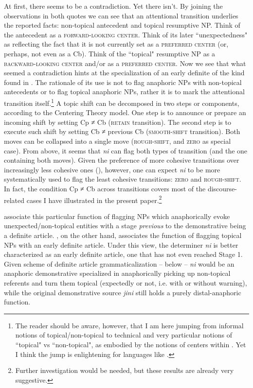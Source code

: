 \documentclass[output=paper
,modfonts
,nonflat]{langsci/langscibook}
\begin{document}
At first, there seems to be a contradiction. Yet there isn't. By joining the observations in both quotes we can see that an attentional transition underlies the reported facts: non-topical antecedent and topical resumptive NP. Think of the antecedent as a \textsc{forward-looking center}. Think of its later ``unexpectedness" as reflecting the fact that it is not currently set as a \textsc{preferred center} (or, perhaps, not even as a Cb). Think of the ``topical" resumptive NP as a \textsc{backward-looking center} and/or as a \textsc{preferred center}. Now we see that what seemed a contradiction hints at the specialization of an early definite of the kind found in . The rationale of its use is not to flag anaphoric NPs with non-topical antecedents or to flag topical anaphoric NPs, rather it is to mark the attentional transition itself.\footnote{The reader should be aware, however, that I am here jumping from informal notions of topical/non-topical to technical and very particular notions of ``topical" vs ``non-topical", as embodied by the notions of centers within . Yet I think the jump is enlightening for languages like .} 
A topic shift can be decomposed in two steps or components, according to the Centering Theory model. One step is to announce or prepare an incoming shift by setting Cp ≠ Cb (\textsc{retain} transition). The second step is to execute such shift by setting Cb ≠ previous Cb (\textsc{smooth-shift} transition). 
Both moves can be collapsed into a single move (\textsc{rough-shift}, and \textsc{zero} as special case). From  above, it seems that \textit{ni} can flag both types of transition (and the one containing both moves). 
Given the preference of more cohesive transitions over increasingly less cohesive ones (), however, one can expect \textit{ni} to be more systematically used to flag the least cohesive transitions: \textsc{zero} and \textsc{rough-shift}. In fact, the condition Cp ≠ Cb across transitions covers most of the discourse-related cases I have illustrated in the present paper.\footnote{Further investigation would be needed, but these results are already very suggestive.}

\citet{HeineKuteva2006} associate this particular function of flagging NPs which anaphorically evoke unexpected/non-topical entities with a stage \textit{previous} to the demonstrative being a definite article. \citet{Givon2001}, on the other hand, associates the function of flagging topical NPs with an early definite article. Under this view, the determiner \textit{ni} is better characterized as an early definite article, one that has not even reached  Stage 1. 
Given  scheme of definite article grammaticalization -- below -- \textit{ni} would be an anaphoric demonstrative specialized in anaphorically picking up non-topical referents and turn them topical (expectedly or not, i.e. with or without warning), while the original demonstrative source \textit{jini} still holds a purely distal-anaphoric function.
\end{document}
